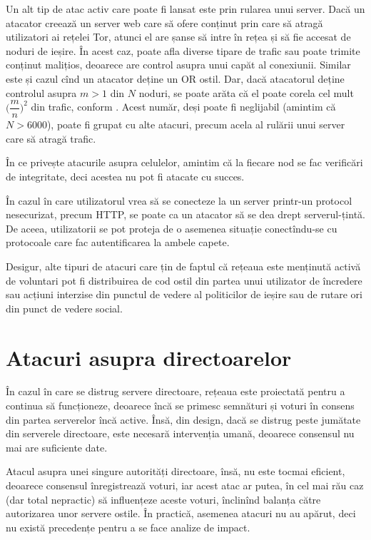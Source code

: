 Un alt tip de atac activ care poate fi lansat este prin rularea unui server.
Dacă un atacator creează un server web care să ofere conținut prin care
să atragă utilizatori ai rețelei Tor, atunci el are șanse să intre în rețea
și să fie accesat de noduri de ieșire. În acest caz, poate afla diverse
tipare de trafic sau poate trimite conținut malițios, deoarece are control
asupra unui capăt al conexiunii. Similar este și cazul cînd un atacator
deține un OR ostil. Dar, dacă atacatorul deține controlul asupra $ m > 1 $
din $ N $ noduri, se poate arăta că el poate corela cel mult $ \Big(\dfrac{m}{n}\Big)^2 $
din trafic, conform \cite{bs}. Acest număr, deși poate fi neglijabil 
(amintim că $ N > 6000 $), poate fi grupat cu alte atacuri, precum acela 
al rulării unui server care să atragă trafic.

În ce privește atacurile asupra celulelor, amintim că la fiecare nod se
fac verificări de integritate, deci acestea nu pot fi atacate cu succes.

În cazul în care utilizatorul vrea să se conecteze la un server printr-un
protocol nesecurizat, precum HTTP, se poate ca un atacator să se dea drept
serverul-țintă. De aceea, utilizatorii se pot proteja de o asemenea situație
conectîndu-se cu protocoale care fac autentificarea la ambele capete.

Desigur, alte tipuri de atacuri care țin de faptul că rețeaua este menținută
activă de voluntari pot fi distribuirea de cod ostil din partea unui utilizator
de încredere sau acțiuni interzise din punctul de vedere al politicilor
de ieșire sau de rutare ori din punct de vedere social.


\section{Atacuri asupra directoarelor}

\indent\indent În cazul în care se distrug servere directoare, rețeaua
este proiectată pentru a continua să funcționeze, deoarece încă se
primesc semnături și voturi în consens din partea serverelor încă
active. Însă, din design, dacă se distrug peste jumătate din serverele
directoare, este necesară intervenția umană, deoarece consensul nu mai
are suficiente date.

Atacul asupra unei singure autorități directoare, însă, nu este tocmai
eficient, deoarece consensul înregistrează voturi, iar acest atac ar
putea, în cel mai rău caz (dar total nepractic) să influențeze aceste
voturi, înclinînd balanța către autorizarea unor servere ostile.
În practică, asemenea atacuri nu au apărut, deci nu există precedențe
pentru a se face analize de impact.

